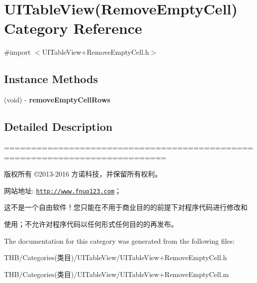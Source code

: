 \hypertarget{category_u_i_table_view_07_remove_empty_cell_08}{}\section{U\+I\+Table\+View(Remove\+Empty\+Cell) Category Reference}
\label{category_u_i_table_view_07_remove_empty_cell_08}


{\ttfamily \#import $<$U\+I\+Table\+View+\+Remove\+Empty\+Cell.\+h$>$}

\subsection*{Instance Methods}
\begin{DoxyCompactItemize}
\item 
\mbox{\label{category_u_i_table_view_07_remove_empty_cell_08_aa602bee6bb290d5781df3602724693df}} 
(void) -\/ {\bfseries remove\+Empty\+Cell\+Rows}
\end{DoxyCompactItemize}


\subsection{Detailed Description}
============================================================================

版权所有 ©2013-\/2016 方诺科技，并保留所有权利。

网站地址\+: \href{http://www.fnuo123.com}{\tt http\+://www.\+fnuo123.\+com}； 



这不是一个自由软件！您只能在不用于商业目的的前提下对程序代码进行修改和

使用；不允许对程序代码以任何形式任何目的的再发布。 

 

The documentation for this category was generated from the following files\+:\begin{DoxyCompactItemize}
\item 
T\+H\+B/\+Categories(类目)/\+U\+I\+Table\+View/U\+I\+Table\+View+\+Remove\+Empty\+Cell.\+h\item 
T\+H\+B/\+Categories(类目)/\+U\+I\+Table\+View/U\+I\+Table\+View+\+Remove\+Empty\+Cell.\+m\end{DoxyCompactItemize}
